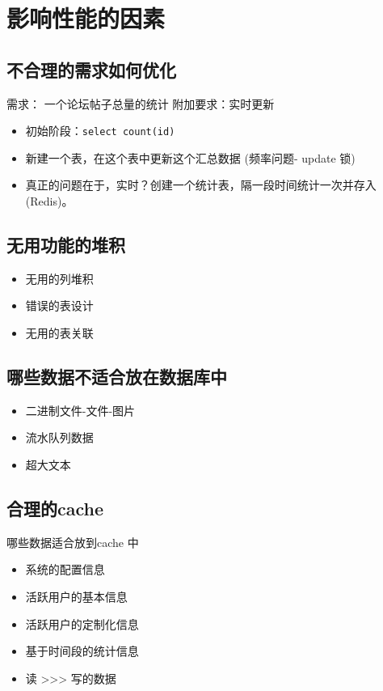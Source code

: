 \documentclass[UTF8,a4paper,12pt]{ctexbook}
\begin{document}
	\section{影响性能的因素}
		\subsection{不合理的需求如何优化}
			需求： 一个论坛帖子总量的统计
			附加要求：实时更新
			
			\begin{itemize}
				\item 初始阶段：\verb|select count(id)|
				\item 新建一个表，在这个表中更新这个汇总数据 (频率问题- update 锁)
				\item 真正的问题在于，实时？创建一个统计表，隔一段时间统计一次并存入(Redis)。
			\end{itemize}
		
		\subsection{无用功能的堆积}
			\begin{itemize}
				\item 无用的列堆积
				\item 错误的表设计
				\item 无用的表关联
			\end{itemize}
		
		
		\subsection{哪些数据不适合放在数据库中}
			\begin{itemize}
				\item 二进制文件-文件-图片
				\item 流水队列数据
				\item 超大文本
			\end{itemize}
		
		
		\subsection{合理的cache}
			哪些数据适合放到cache 中
			\begin{itemize}
				\item 系统的配置信息 
				\item 活跃用户的基本信息 
				\item 活跃用户的定制化信息
				\item 基于时间段的统计信息
				\item 读 >>> 写的数据
			\end{itemize}
		
\end{document}
